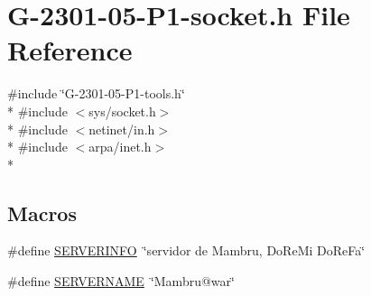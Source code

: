 \hypertarget{_g-2301-05-_p1-socket_8h}{\section{G-\/2301-\/05-\/\-P1-\/socket.h File Reference}
\label{_g-2301-05-_p1-socket_8h}
}
{\ttfamily \#include \char`\"{}G-\/2301-\/05-\/\-P1-\/tools.\-h\char`\"{}}\\*
{\ttfamily \#include $<$sys/socket.\-h$>$}\\*
{\ttfamily \#include $<$netinet/in.\-h$>$}\\*
{\ttfamily \#include $<$arpa/inet.\-h$>$}\\*
\subsection*{Macros}
\begin{DoxyCompactItemize}
\item 
\#define \hyperlink{_g-2301-05-_p1-socket_8h_a6cd6cae86cd5361650f9672609970907}{S\-E\-R\-V\-E\-R\-I\-N\-F\-O}~\char`\"{}servidor de Mambru, Do\-Re\-Mi Do\-Re\-Fa\char`\"{}
\item 
\#define \hyperlink{_g-2301-05-_p1-socket_8h_aab4f68861c2e03b2a78c37c2213cb350}{S\-E\-R\-V\-E\-R\-N\-A\-M\-E}~\char`\"{}Mambru@war\char`\"{}
\end{DoxyCompactItemize}

